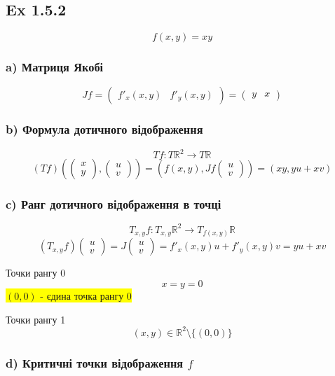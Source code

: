 \documentclass[10pt, a4paper]{article} %
\newcommand{\R}{\mathbb{R}}
\newcommand{\J}{J}
\begin{document}
\subsection*{Ex 1.5.2}
\begin{mdframed}
    \[f(x,y) = xy\]
\end{mdframed}

\subsubsection*{a) Матриця Якобі}
\[\J f = \begin{pmatrix}
    f'_x(x,y) & f'_y(x,y)
\end{pmatrix} = \begin{pmatrix}
    y & x
\end{pmatrix}\]

\subsubsection*{b) Формула дотичного відображення}
\[Tf : T\R^2 \to T\R\]
\[(Tf)\left(\begin{pmatrix} x \\ y \end{pmatrix}, \begin{pmatrix} u \\ v \end{pmatrix}\right) 
= \left(f(x,y),\J f \begin{pmatrix} u \\ v \end{pmatrix}\right) 
= \left(xy, yu+xv\right)\]

\subsubsection*{c) Ранг дотичного відображення в точці}
\[T_{x,y} f : T_{x,y}\R^2 \to T_{f(x,y)}\R\]
\[(T_{x,y} f) \begin{pmatrix} u \\ v \end{pmatrix}
= J\begin{pmatrix} u \\ v \end{pmatrix} = f'_x(x,y) u + f'_y(x,y) v = yu+xv\]

Точки рангу 0
\[x=y=0\]
\colorbox{yellow}{$(0,0)$ - єдина точка рангу 0}

Точки рангу 1
\[(x,y) \in \R^2 \setminus \{(0,0)\}\]

\subsubsection*{d) Критичні точки відображення $f$}
\end{document}
